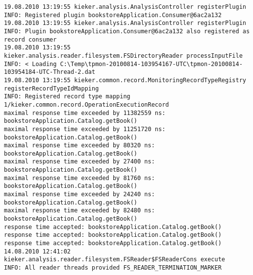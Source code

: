\setBashListing
\begin{lstlisting}
19.08.2010 13:19:55 kieker.analysis.AnalysisController registerPlugin
INFO: Registered plugin bookstoreApplication.Consumer@6ac2a132
19.08.2010 13:19:55 kieker.analysis.AnalysisController registerPlugin
INFO: Plugin bookstoreApplication.Consumer@6ac2a132 also registered as record consumer
19.08.2010 13:19:55 kieker.analysis.reader.filesystem.FSDirectoryReader processInputFile
INFO: < Loading C:\Temp\tpmon-20100814-103954167-UTC\tpmon-20100814-103954184-UTC-Thread-2.dat
19.08.2010 13:19:55 kieker.common.record.MonitoringRecordTypeRegistry registerRecordTypeIdMapping
INFO: Registered record type mapping 1/kieker.common.record.OperationExecutionRecord
maximal response time exceeded by 11382559 ns: bookstoreApplication.Catalog.getBook()
maximal response time exceeded by 11251720 ns: bookstoreApplication.Catalog.getBook()
maximal response time exceeded by 80320 ns: bookstoreApplication.Catalog.getBook()
maximal response time exceeded by 27400 ns: bookstoreApplication.Catalog.getBook()
maximal response time exceeded by 81760 ns: bookstoreApplication.Catalog.getBook()
maximal response time exceeded by 24240 ns: bookstoreApplication.Catalog.getBook()
maximal response time exceeded by 82480 ns: bookstoreApplication.Catalog.getBook()
response time accepted: bookstoreApplication.Catalog.getBook()
response time accepted: bookstoreApplication.Catalog.getBook()
response time accepted: bookstoreApplication.Catalog.getBook()
14.08.2010 12:41:02 kieker.analysis.reader.filesystem.FSReader$FSReaderCons execute
INFO: All reader threads provided FS_READER_TERMINATION_MARKER
\end{lstlisting}